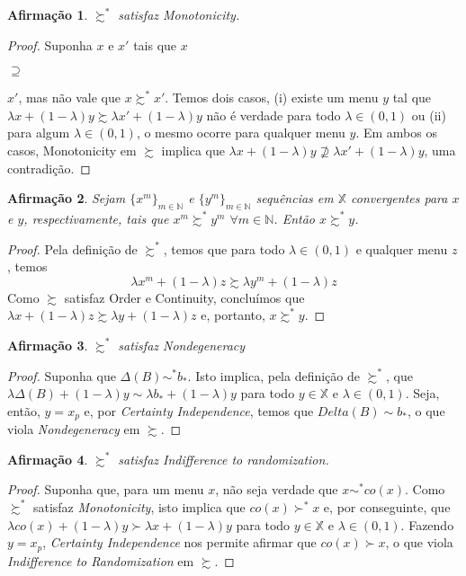 \documentclass[11pt, a4paper]{article}
\theoremstyle{nonumberplain}
\newtheorem{proof}{Dem.}
\theoremstyle{plain}
\theoremstyle{plain}
\newtheorem{claim}{Afirmação}
\theoremstyle{plain}
\begin{document}
\begin{claim}\label{monotonicidade}$\succsim^*$ satisfaz Monotonicity. \end{claim}
\begin{proof}
Suponha $x$ e $x'$ tais que $x$\begin{small}$\supseteq$\end{small}$x'$, mas não vale que $x\succsim^* x'$. Temos dois casos, (i) existe um menu $y$ tal que $\lambda x + (1-\lambda)y\succsim \lambda x' + (1-\lambda)y$ não é verdade para todo $\lambda\in(0,1)$ ou (ii) para algum $\lambda\in(0,1)$, o mesmo ocorre para qualquer menu $y$. Em ambos os casos, Monotonicity em $\succsim$ implica que $\lambda x + (1-\lambda)y \nsupseteq \lambda x' + (1-\lambda)y$, uma contradição.   
\end{proof}

\begin{claim}\label{continuidade} Sejam $\{x^m\}_{m\in\mathbb{N}}$ e $\{y^m\}_{m\in\mathbb{N}}$ sequências em $\mathbb{X}$ convergentes para $x$ e $y$, respectivamente, tais que $x^m\succsim^* y^m$ $\forall m\in \mathbb{N}$. Então $x\succsim^* y$.\end{claim}
\begin{proof}
Pela definição de $\succsim^*$, temos que para todo $\lambda\in (0,1)$ e qualquer menu $z$, temos $$\lambda x^m + (1-\lambda)z \succsim \lambda y^m + (1-\lambda)z$$ Como $\succsim$ satisfaz Order e Continuity, concluímos que $\lambda x + (1-\lambda)z \succsim \lambda y + (1-\lambda)z$ e, portanto, $x\succsim^* y$.
\end{proof}

\begin{claim}$\succsim^*$ satisfaz \emph{Nondegeneracy}\end{claim}
\begin{proof}
Suponha que $\Delta(B)\sim^* b_*$. Isto implica, pela definição de $\succsim^*$, que $\lambda \Delta(B)+(1-\lambda)y \sim \lambda b_*+(1-\lambda)y$ para todo $y \in \mathbb{X}$ e $\lambda \in (0,1)$. Seja, então, $y=x_p$ e, por \emph{Certainty Independence}, temos que $Delta(B)\sim b_*$, o que viola \emph{Nondegeneracy} em $\succsim$.
\end{proof}

\begin{claim}$\succsim^*$ satisfaz \emph{Indifference to randomization}.\end{claim}
\begin{proof}
Suponha que, para um menu $x$, não seja verdade que $x\sim^* co(x)$. Como $\succsim^*$ satisfaz \emph{Monotonicity}, isto implica que $co(x)\succ^* x$ e, por conseguinte, que $\lambda co(x)+(1-\lambda)y \succ \lambda x+(1-\lambda)y$ para todo $y \in \mathbb{X}$ e $\lambda \in (0,1)$. Fazendo $y=x_p$, \emph{Certainty Independence} nos permite afirmar que $co(x)\succ x$, o que viola \emph{Indifference to Randomization} em $\succsim$.  
\end{proof}
\end{document}
